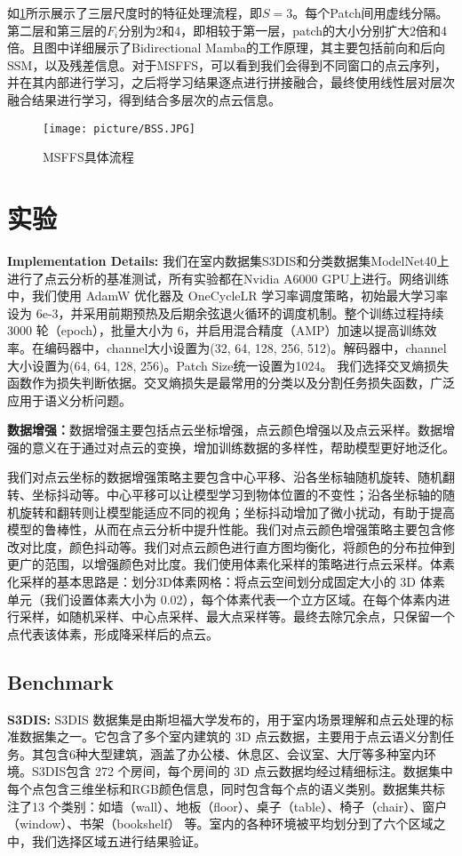 \documentclass[preprint,12pt]{elsarticle}
\begin{document}
	如\cref{fig:bss}所示展示了三层尺度时的特征处理流程，即$S=3$。每个Patch间用虚线分隔。第二层和第三层的$F_{i}$分别为2和4，即相较于第一层，patch的大小分别扩大2倍和4倍。且图中详细展示了Bidirectional Mamba的工作原理，其主要包括前向和后向SSM，以及残差信息。对于MSFFS，可以看到我们会得到不同窗口的点云序列，并在其内部进行学习，之后将学习结果逐点进行拼接融合，最终使用线性层对层次融合结果进行学习，得到结合多层次的点云信息。

\begin{figure}[htbp]
	\centering
	\texttt{[image: picture/BSS.JPG]}
	\caption{MSFFS具体流程}
	\label{fig:bss}
\end{figure}







\section{实验}
\textbf{Implementation Details:}
我们在室内数据集S3DIS和分类数据集ModelNet40上进行了点云分析的基准测试，所有实验都在Nvidia A6000 GPU上进行。网络训练中，我们使用 AdamW 优化器及 OneCycleLR 学习率调度策略，初始最大学习率设为 6e-3，并采用前期预热及后期余弦退火循环的调度机制。整个训练过程持续 3000 轮（epoch），批量大小为 6，并启用混合精度（AMP）加速以提高训练效率。在编码器中，channel大小设置为(32, 64, 128, 256, 512)。解码器中，channel大小设置为(64, 64, 128, 256)。Patch Size统一设置为1024。
我们选择交叉熵损失函数作为损失判断依据。交叉熵损失是最常用的分类以及分割任务损失函数，广泛应用于语义分析问题。

\textbf{数据增强：}数据增强主要包括点云坐标增强，点云颜色增强以及点云采样。数据增强的意义在于通过对点云的变换，增加训练数据的多样性，帮助模型更好地泛化。

我们对点云坐标的数据增强策略主要包含中心平移、沿各坐标轴随机旋转、随机翻转、坐标抖动等。中心平移可以让模型学习到物体位置的不变性；沿各坐标轴的随机旋转和翻转则让模型能适应不同的视角；坐标抖动增加了微小扰动，有助于提高模型的鲁棒性，从而在点云分析中提升性能。我们对点云颜色增强策略主要包含修改对比度，颜色抖动等。我们对点云颜色进行直方图均衡化，将颜色的分布拉伸到更广的范围，以增强颜色对比度。我们使用体素化采样的策略进行点云采样。体素化采样的基本思路是：划分3D体素网格：将点云空间划分成固定大小的 3D 体素单元（我们设置体素大小为 0.02），每个体素代表一个立方区域。在每个体素内进行采样，如随机采样、中心点采样、最大点采样等。最终去除冗余点，只保留一个点代表该体素，形成降采样后的点云。


\subsection{Benchmark}
\textbf{S3DIS:}
S3DIS 数据集是由斯坦福大学发布的，用于室内场景理解和点云处理的标准数据集之一。它包含了多个室内建筑的 3D 点云数据，主要用于点云语义分割任务。其包含6种大型建筑，涵盖了办公楼、休息区、会议室、大厅等多种室内环境。S3DIS包含 272 个房间，每个房间的 3D 点云数据均经过精细标注。数据集中每个点包含三维坐标和RGB颜色信息，同时包含每个点的语义类别。数据集共标注了13 个类别：如墙（wall）、地板（floor）、桌子（table）、椅子（chair）、窗户（window）、书架（bookshelf） 等。室内的各种环境被平均划分到了六个区域之中，我们选择区域五进行结果验证。
\end{document}
